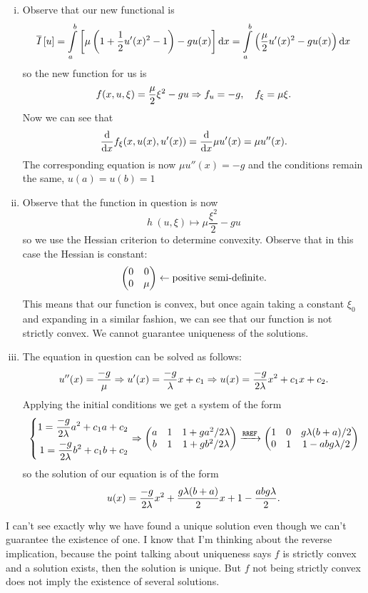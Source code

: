 \documentclass[12pt]{memoir}
\begin{document}
\begin{ptcbr}
    \begin{enumerate}[i)]
        \item Observe that our new functional is 
        $$\ov I\bonj{u}=\int\limits_a^b \bonj{\mu\left(1+\half u'(x)^2-1\right)-gu(x)}\dd x=\int\limits_a^b \left(\frac{\mu}{2}u'(x)^2-gu(x)\right)\dd x$$
        so the new function for us is 
        $$f(x,u,\xi)=\frac{\mu}{2}\xi^2-gu\Rightarrow f_u=-g,\quad f_\xi=\mu\xi.$$
        Now we can see that
        $$\dv{x}f_{\xi}(x,u(x),u'(x))=\dv{x}\mu u'(x)=\mu u''(x).$$
        The corresponding equation is now $\mu u''(x)=-g$ and the conditions remain the same, $u(a)=u(b)=1$
        \item Observe that the function in question is now 
        $$h\:(u,\xi)\mapsto \mu\frac{\xi^2}{2}-gu$$
        so we use the Hessian criterion to determine convexity. Observe that in this case the Hessian is constant:
        $$\begin{pmatrix} 0 & 0 \\ 0 & \mu \end{pmatrix}\leftarrow\text{positive semi-definite}.$$
        This means that our function is convex, but once again taking a constant $\xi_0$ and expanding in a similar fashion, we can see that our function is not strictly convex. We cannot guarantee uniqueness of the solutions.
        \item The equation in question can be solved as follows:
        $$u''(x)=\frac{-g}{\mu}\Rightarrow u'(x)=\frac{-g}{\lambda}x+c_1\Rightarrow u(x)=\frac{-g}{2\lambda}x^2+c_1x+c_2.$$
        Applying the initial conditions we get a system of the form 
        $$
        \left\lbrace
        \begin{aligned}
            1=\frac{-g}{2\lambda}a^2+c_1a+c_2\\
            1=\frac{-g}{2\lambda}b^2+c_1b+c_2
        \end{aligned}
        \right.\Rightarrow
        \begin{pmatrix} a & 1 & 1+ga^2/2\lambda\\ b & 1 & 1+gb^2/2\lambda \end{pmatrix}\xrightarrow[]{\texttt{RREF}}\begin{pmatrix} 1 & 0 & g\lambda(b+a)/2\\ 0 & 1 & 1-abg\lambda/2 \end{pmatrix}
        $$
        so the solution of our equation is of the form 
        $$u(x)=\frac{-g}{2\lambda}x^2+\frac{g\lambda(b+a)}{2}x+1-\frac{abg\lambda}{2}.$$
    \end{enumerate}
\end{ptcbr}

\begin{nonum-Rmk}
I can't see exactly why we have found a unique solution even though we can't guarantee the existence of one. I know that I'm thinking about the reverse implication, because the point talking about uniqueness says $f$ is strictly convex and a solution exists, then the solution is unique. But $f$ not being strictly convex does not imply the existence of several solutions.
\end{nonum-Rmk}
\end{document}
